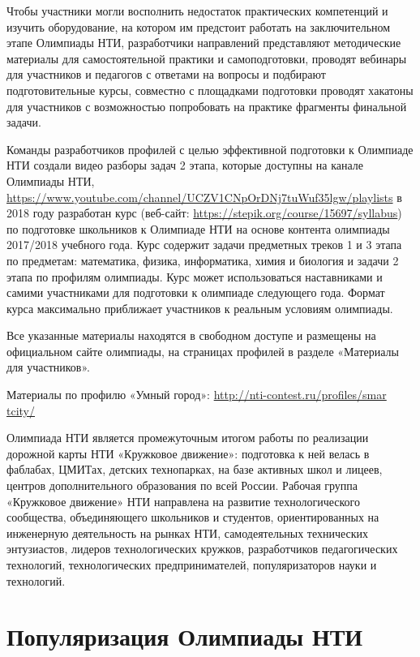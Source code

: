 Чтобы участники могли восполнить недостаток практических компетенций и изучить оборудование, на котором им предстоит работать на заключительном этапе Олимпиады НТИ, разработчики направлений представляют методические материалы для самостоятельной практики и самоподготовки, проводят вебинары для участников и педагогов с ответами на вопросы и подбирают подготовительные курсы, совместно с площадками подготовки проводят хакатоны для участников с возможностью попробовать на практике фрагменты финальной задачи. 

Команды разработчиков профилей с целью эффективной подготовки к Олимпиаде НТИ создали видео разборы задач 2 этапа, которые доступны на канале Олимпиады НТИ, \url{https://www.youtube.com/channel/UCZV1CNpOrDNj7tuWuf35lgw/playlists} в 2018 году разработан курс (веб-сайт: \url{https://stepik.org/course/15697/syllabus}) по подготовке школьников к Олимпиаде НТИ на основе контента олимпиады 2017/2018 учебного года. Курс содержит задачи предметных треков 1 и 3 этапа по предметам: математика, физика, информатика, химия и биология и задачи 2 этапа по профилям олимпиады. Курс может использоваться наставниками и самими участниками для подготовки к олимпиаде следующего года. Формат курса максимально приближает участников к реальным условиям олимпиады.

Все указанные материалы находятся в свободном доступе и размещены на официальном сайте олимпиады, на страницах профилей в разделе «Материалы для участников». 

Материалы по профилю «Умный город»: \url{http://nti-contest.ru/profiles/smar}\\\url{tcity/}

Олимпиада НТИ является промежуточным итогом работы по реализации дорожной карты НТИ «Кружковое движение»: подготовка к ней велась в фаблабах, ЦМИТах, детских технопарках, на базе активных школ и лицеев, центров дополнительного образования по всей России. Рабочая группа «Кружковое движение» НТИ направлена на развитие технологического сообщества, объединяющего школьников и студентов, ориентированных на инженерную деятельность на рынках НТИ, самодеятельных технических энтузиастов, лидеров технологических кружков, разработчиков педагогических технологий, технологических предпринимателей, популяризаторов науки и технологий.

\section*{Популяризация Олимпиады НТИ}


